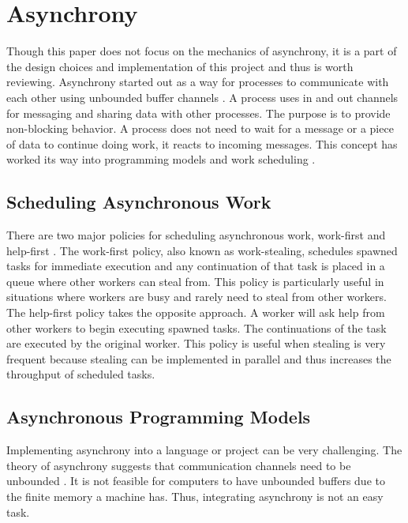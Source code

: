 \section{Asynchrony}

Though this paper does not focus on the mechanics of asynchrony, it is a part of the design choices and implementation of this project and thus is worth reviewing. Asynchrony started out as a way for processes to communicate with each other using unbounded buffer channels \cite{Josephs1989}. A process uses in and out channels for messaging and sharing data with other processes. The purpose is to provide non-blocking behavior. A process does not need to wait for a message or a piece of data to continue doing work, it reacts to incoming messages. This concept has worked its way into programming models and work scheduling \cite{Guo2009}\cite{Leijen2009}\cite{syme2011f}\cite{sutcliffe1988jackson}\cite{Cameron1986}\cite{Frigo1998}.

\subsection{Scheduling Asynchronous Work}

There are two major policies for scheduling asynchronous work, work-first and help-first \cite{Guo2009}. The work-first policy, also known as work-stealing, schedules spawned tasks for immediate execution and any continuation of that task is placed in a queue where other workers can steal from. This policy is particularly useful in situations where workers are busy and rarely need to steal from other workers. The help-first policy takes the opposite approach. A worker will ask help from other workers to begin executing spawned tasks. The continuations of the task are executed by the original worker. This policy is useful when stealing is very frequent because stealing can be implemented in parallel and thus increases the throughput of scheduled tasks.

\subsection{Asynchronous Programming Models}

Implementing asynchrony into a language or project can be very challenging. The theory of asynchrony suggests that communication channels need to be unbounded \cite{He1990}. It is not feasible for computers to have unbounded buffers due to the finite memory a machine has. Thus, integrating asynchrony is not an easy task.

